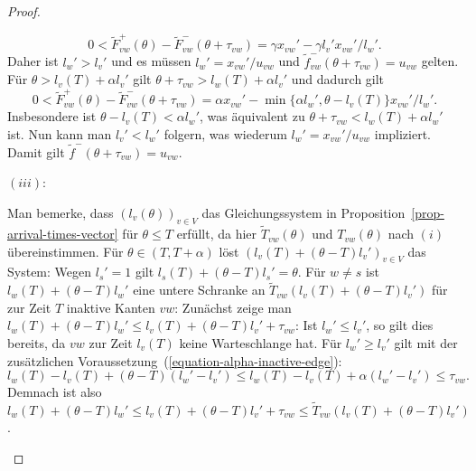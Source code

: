 \begin{proof}
\begin{description}[leftmargin=0cm, topsep=0cm, itemindent=0.5cm]
		\[
		0<\tilde{F}_{vw}^+(\theta) - \tilde{F}_{vw}^-(\theta + \tau_{vw})= \gamma x_{vw}' - \gamma l_v' x_{vw}'/l_w'.
		\]
		Daher ist $l_w' > l_v'$ und es müssen $l_w' = x_{vw}'/u_{vw}$ und $\tilde{f}_{vw}^-(\theta + \tau_{vw}) = u_{vw}$ gelten.
		Für $\theta > l_v(T) + \alpha l_v'$ gilt $\theta + \tau_{vw} > l_w(T) + \alpha l_v'$ und dadurch gilt
		\[
		0 < \tilde{F}_{vw}^+(\theta) - \tilde{F}_{vw}^-(\theta + \tau_{vw}) = \alpha x_{vw}' - \min \{ \alpha l_w', \theta - l_v(T) \}x_{vw}'/l_w'.
		\]
		Insbesondere ist $\theta - l_v(T) < \alpha l_w'$, was äquivalent zu $\theta + \tau_{vw} < l_w(T) + \alpha l_w'$ ist.
		Nun kann man $l_v' < l_w'$ folgern, was wiederum $l_w' = x_{vw}'/u_{vw}$ impliziert.
		Damit gilt $\tilde{f}^-(\theta + \tau_{vw}) = u_{vw}$.
		
		\item[Zu] $(iii)$:
		
		Man bemerke, dass $(l_v(\theta))_{v\in V}$ das Gleichungssystem in Proposition~\ref{prop-arrival-times-vector} für $\theta \leq T$ erfüllt, da hier $\tilde{T}_{vw}(\theta)$ und $T_{vw}(\theta)$ nach $(i)$ übereinstimmen.
		Für $\theta \in (T, T+\alpha)$ löst $(l_v(T) + (\theta - T)l_v')_{v\in V}$ das System:
		Wegen $l_s' = 1$ gilt $l_s(T) + (\theta - T)l_s' = \theta$.
		Für $w\neq s$ ist $l_w(T) + (\theta - T) l_w'$ eine untere Schranke an $\tilde{T}_{vw}(l_v(T) + (\theta - T) l_v')$ für zur Zeit $T$ inaktive Kanten $vw$:
		Zunächst zeige man $l_w(T) + (\theta - T)l_w' \leq l_v(T) + (\theta - T)l_v' + \tau_{vw}$:
		Ist $l_w' \leq l_v'$, so gilt dies bereits, da $vw$ zur Zeit $l_v(T)$ keine Warteschlange hat.
		Für $l_w' \geq l_v'$ gilt mit der zusätzlichen Voraussetzung~(\ref{equation-alpha-inactive-edge}):
		\[
		l_w(T) - l_v(T) + (\theta - T) (l_w' - l_v') \leq l_w(T) - l_v(T) + \alpha (l_w' - l_v') \leq \tau_{vw}.
		\]
		Demnach ist also $l_w(T) + (\theta - T) l_w' \leq l_v(T) + (\theta - T) l_v' + \tau_{vw} \leq \tilde{T}_{vw}(l_v(T) + (\theta - T) l_v')$.
		

\end{description}
\end{proof}
